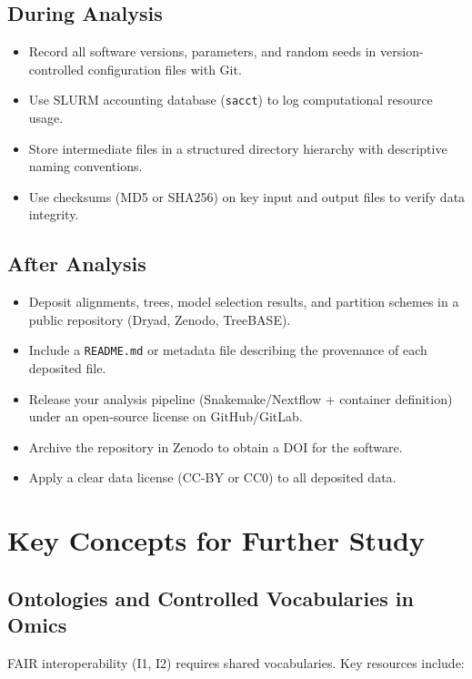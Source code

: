 \subsection{During Analysis}

\begin{itemize}
\item [ ] Record all software versions, parameters, and random seeds in version-controlled configuration files with Git.
\item [ ] Use SLURM accounting database (\texttt{sacct}) to log computational resource usage.
\item [ ] Store intermediate files in a structured directory hierarchy with descriptive naming conventions.
\item [ ] Use checksums (MD5 or SHA256) on key input and output files to verify data integrity.
\end{itemize}

\subsection{After Analysis}

\begin{itemize}
\item [ ] Deposit alignments, trees, model selection results, and partition schemes in a public repository (Dryad, Zenodo, TreeBASE).
\item [ ] Include a \texttt{README.md} or metadata file describing the provenance of each deposited file.
\item [ ] Release your analysis pipeline (Snakemake/Nextflow + container definition) under an open-source license on GitHub/GitLab.
\item [ ] Archive the repository in Zenodo to obtain a DOI for the software.
\item [ ] Apply a clear data license (CC-BY or CC0) to all deposited data.
\end{itemize}

\section{Key Concepts for Further Study}

\subsection{Ontologies and Controlled Vocabularies in Omics}

FAIR interoperability (I1, I2) requires shared vocabularies. Key resources include:

